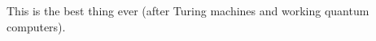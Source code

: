 \documentclass[12pt]{sigbovik-review}
\author{The authors' professors}
\begin{document}
\maketitle

This is the best thing ever (after Turing machines and working quantum computers).
\end{document}
